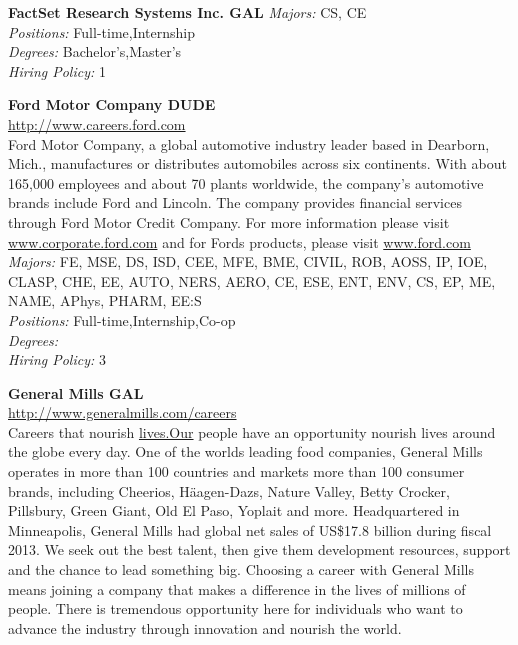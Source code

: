 \documentclass[twoside]{article}
\begin{document}
\begin{center}
\begin{multicols}{2}
\begin{minipage}{.95\columnwidth}{\Large\bf FactSet Research Systems Inc. \hfill GAL}
    \emph{Majors:} CS, CE\\
    \emph{Positions:} Full-time,Internship\\
    \emph{Degrees:} Bachelor's,Master's\\
    \emph{Hiring Policy:} 1\\
\end{minipage}
 \begin{minipage}{.95\columnwidth}{\Large\bf Ford Motor Company \hfill DUDE}\\
    \url{http://www.careers.ford.com}\\
    Ford Motor Company, a global automotive industry leader based in Dearborn, Mich., manufactures or distributes automobiles across six continents. With about 165,000 employees and about 70 plants worldwide, the company's automotive brands include Ford and Lincoln. The company provides financial services through Ford Motor Credit Company. For more information please visit \url{www.corporate.ford.com} and for Fords products, please visit \url{www.ford.com}\\
    \emph{Majors:} FE, MSE, DS, ISD, CEE, MFE, BME, CIVIL, ROB, AOSS, IP, IOE, CLASP, CHE, EE, AUTO, NERS, AERO, CE, ESE, ENT, ENV, CS, EP, ME, NAME, APhys, PHARM, EE:S\\
    \emph{Positions:} Full-time,Internship,Co-op\\
    \emph{Degrees:} \\
    \emph{Hiring Policy:} 3\\
\end{minipage}
 \begin{minipage}{.95\columnwidth}{\Large\bf General Mills \hfill GAL}\\
    \url{http://www.generalmills.com/careers}\\
    Careers that nourish \url{lives.Our} people have an opportunity nourish lives around the globe every day. One of the worlds leading food companies, General Mills operates in more than 100 countries and markets more than 100 consumer brands, including Cheerios, Häagen-Dazs, Nature Valley, Betty Crocker, Pillsbury, Green Giant, Old El Paso, Yoplait and more. Headquartered in Minneapolis, General Mills had global net sales of US\$17.8 billion during fiscal 2013. We seek out the best talent, then give them development resources, support and the chance to lead something big. Choosing a career with General Mills means joining a company that makes a difference in the lives of millions of people. There is tremendous opportunity here for individuals who want to advance the industry through innovation and nourish the world.\\

\end{minipage}
\end{multicols}
\end{center}
\end{document}
